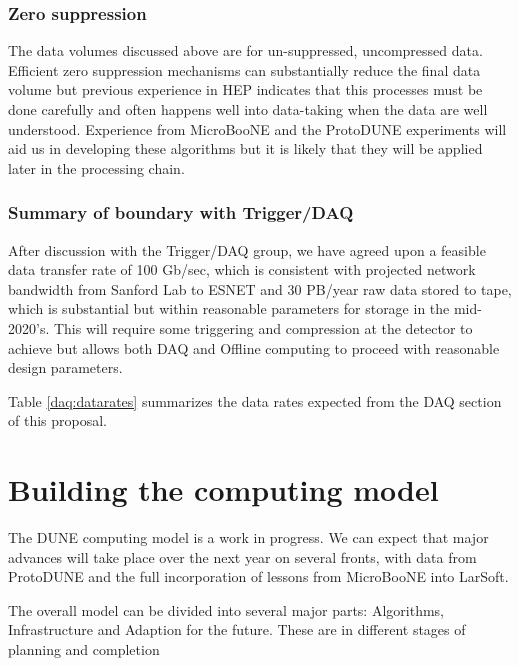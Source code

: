 \subsubsection{Zero suppression}

The data volumes discussed above are for un-suppressed, uncompressed data.  Efficient zero suppression mechanisms can substantially reduce the final data volume but previous experience in HEP indicates that this processes must be done carefully and often happens well into data-taking when the data are well understood.  Experience from MicroBooNE and the ProtoDUNE experiments will aid us in developing these algorithms but it is likely that they will be applied later in the processing chain.  

\subsubsection{Summary of boundary with Trigger/DAQ}

After discussion with the Trigger/DAQ group, we have agreed upon a feasible data transfer rate of 100 Gb/sec, which is consistent with projected network bandwidth from Sanford Lab to ESNET and 30 PB/year raw data stored to tape, which is substantial but within reasonable parameters for storage in the mid-2020's.  This will require some triggering and compression at the detector to achieve but allows both DAQ and Offline computing to proceed with reasonable design parameters.

Table \ref{daq:datarates} summarizes the data rates expected from the DAQ section of this proposal. 



\section{Building the computing model}\label{sw:bld-cmp-mdl}

The DUNE computing model is a work in progress.  We can expect that major advances will take place over the next year on several fronts, with data from ProtoDUNE and the full incorporation of lessons from MicroBooNE into LarSoft. 


The overall model can be divided into several major parts: Algorithms, Infrastructure and Adaption for the future.  These are in different stages of planning and completion

